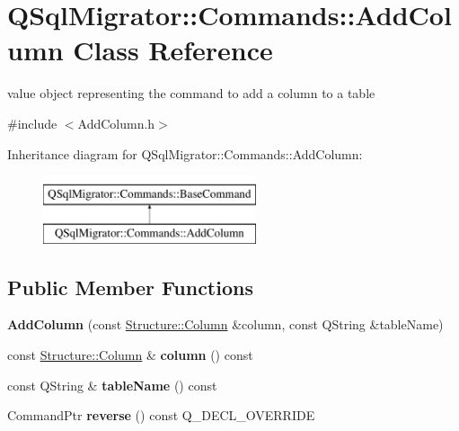 \hypertarget{class_q_sql_migrator_1_1_commands_1_1_add_column}{}\section{Q\+Sql\+Migrator\+:\+:Commands\+:\+:Add\+Column Class Reference}
\label{class_q_sql_migrator_1_1_commands_1_1_add_column}


value object representing the command to add a column to a table  




{\ttfamily \#include $<$Add\+Column.\+h$>$}

Inheritance diagram for Q\+Sql\+Migrator\+:\+:Commands\+:\+:Add\+Column\+:\begin{figure}[H]
\begin{center}
\leavevmode
\includegraphics[height=2.000000cm]{class_q_sql_migrator_1_1_commands_1_1_add_column}
\end{center}
\end{figure}
\subsection*{Public Member Functions}
\begin{DoxyCompactItemize}
\item 
\mbox{\label{class_q_sql_migrator_1_1_commands_1_1_add_column_a131604bb008e1dc369c54274a86ef7fa}} 
{\bfseries Add\+Column} (const \hyperlink{class_q_sql_migrator_1_1_structure_1_1_column}{Structure\+::\+Column} \&column, const Q\+String \&table\+Name)
\item 
\mbox{\label{class_q_sql_migrator_1_1_commands_1_1_add_column_a776e84c43628b22964438b9875e03b3b}} 
const \hyperlink{class_q_sql_migrator_1_1_structure_1_1_column}{Structure\+::\+Column} \& {\bfseries column} () const
\item 
\mbox{\label{class_q_sql_migrator_1_1_commands_1_1_add_column_afc7ad789564decdaadfdcd434a9bc842}} 
const Q\+String \& {\bfseries table\+Name} () const
\item 
\mbox{\label{class_q_sql_migrator_1_1_commands_1_1_add_column_a78a9cc887121b5386af5167762083600}} 
Command\+Ptr {\bfseries reverse} () const Q\+\_\+\+D\+E\+C\+L\+\_\+\+O\+V\+E\+R\+R\+I\+DE
\end{DoxyCompactItemize}
